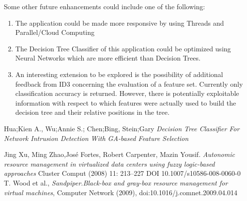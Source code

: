 \documentclass[conference]{IEEEtran}
\begin{document}
Some other future enhancements could include one of the following:
\begin{enumerate}
\item{The application could be made more responsive by using Threads and Parallel/Cloud Computing}
\item{The Decision Tree Classifier of this application could be optimized using Neural Networks which are more efficient than Decision Trees.}
\item{An interesting extension to be explored is the possibility of
additional feedback from ID3 concerning the evaluation of a
feature set. Currently only classification accuracy is returned.
However, there is potentially exploitable information with
respect to which features were actually used to build the
decision tree and their relative positions in the tree.}

\end{enumerate}


\begin{thebibliography}{1}

Hua;Kien A., Wu;Annie S.; Chen;Bing, Stein;Gary
\emph{Decision Tree Classifier For Network Intrusion Detection
With GA-based Feature Selection}

Jing Xu, Ming Zhao,José Fortes, Robert Carpenter,
Mazin Yousif. \emph{Autonomic resource management in virtualized data centers using
fuzzy logic-based approaches} Cluster Comput (2008) 11: 213–227
DOI 10.1007/s10586-008-0060-0
T. Wood et al., \emph{Sandpiper.Black-box and gray-box resource management for virtual machines}, Computer Network (2009), doi:10.1016/j.comnet.2009.04.014
\end{thebibliography}
\end{document}

